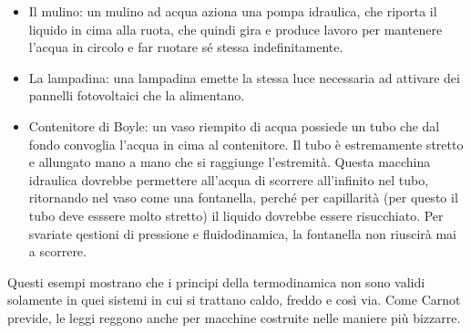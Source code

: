 \begin{itemize}
    \item Il mulino: un mulino ad acqua aziona una pompa idraulica,
    che riporta il liquido in cima alla ruota, che quindi gira e
    produce lavoro per mantenere l'acqua in circolo e far ruotare
    sé stessa indefinitamente.

    \item La lampadina: una lampadina emette la stessa luce necessaria
    ad attivare dei pannelli fotovoltaici che la alimentano.

    \item Contenitore di Boyle: un vaso riempito di acqua possiede
    un tubo che dal fondo convoglia l'acqua in cima al contenitore.
    Il tubo è estremamente stretto e allungato mano a mano che si
    raggiunge l'estremità. Questa macchina idraulica dovrebbe permettere
    all'acqua di scorrere all'infinito nel tubo, ritornando nel
    vaso come una fontanella, perché per capillarità (per questo il tubo deve esssere molto
    stretto) il liquido dovrebbe essere risucchiato. Per svariate
    qestioni di pressione e fluidodinamica, la fontanella non
    riuscirà mai a scorrere.
\end{itemize}

Questi esempi mostrano che i principi della termodinamica non
sono validi solamente in quei sistemi in cui si trattano caldo,
freddo e così via. Come Carnot previde, le leggi reggono anche
per macchine costruite nelle maniere più bizzarre.